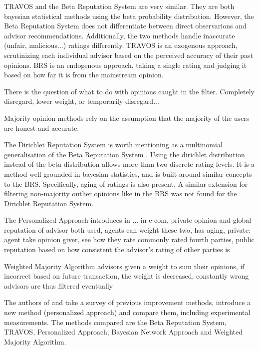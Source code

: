 \documentclass[%
    ]{\PathToTumTemplate/thesis/tum_thesis}
\begin{document}
TRAVOS and the Beta Reputation System are very similar. They are both bayesian statistical methods using the beta probability distribution. However, the Beta Reputation System does not differentiate between direct observarions and advisor recommendations. Additionally, the two methods handle inaccurate (unfair, malicious...) ratings differently. TRAVOS is an exogenous approach, scrutinizing each individual advisor based on the perceived accuracy of their past opinions. BRS is an endogenous approach, taking a single rating and judging it based on how far it is from the mainstream opinion.


There is the question of what to do with opinions caught in the filter. Completely disregard, lower weight, or temporarily disregard...

Majority opinion methods rely on the assumption that the majority of the users are honest and accurate.



The Dirichlet Reputation System is worth mentioning as a multinomial generalisation of the Beta Reputation System \cite{josang_dirichlet_2007}. Using the dirichlet distribution instead of the beta distribution allows more than two discrete rating levels. It is a method well grounded in bayesian statistics, and is built around similar concepts to the BRS. Specifically, aging of ratings is also present. A similar extension for filtering non-majority outlier opinions like in the BRS was not found for the Dirichlet Reputation System.


The Personalized Approach introduces in \cite{zhang_personalized_2006} ...
in e-com, private opinion and global reputation of advisor both used, agents can weight these two, has aging, private: agent take opinion giver, see how they rate commonly rated fourth parties, public reputation based on how consistent the advisor's rating of other parties is

\cite{yu_detecting_2003} Weighted Majority Algorithm 
advisors given a weight to sum their opinions, if incorrect based on future transaction, the weight is decreased, constantly wrong advisors are thus filtered eventually

The authors of \cite{zhang_personalized_2006} and \cite{zhang_detailed_2008} take a survey of previous improvement methods, introduce a new method (personalized approach) and compare them, including experimental measurements. The methods compared are the Beta Reputation System, TRAVOS, Personalized Approach, Bayesian Network Approach and Weighted Majority Algorithm. 
\end{document}
